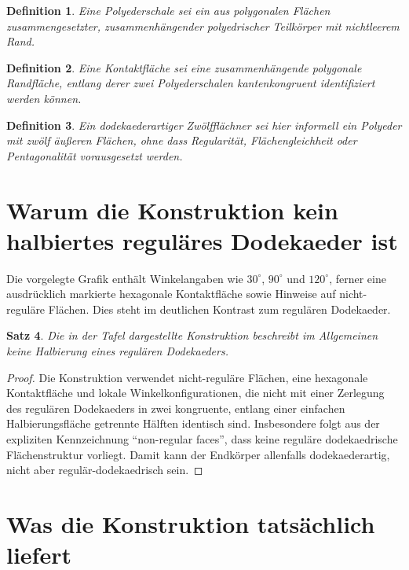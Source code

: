 \documentclass[11pt]{article}
\newtheorem{satz}{Satz}
\newtheorem{definition}[satz]{Definition}
\begin{document}
	\begin{definition}
		Eine \emph{Polyederschale} sei ein aus polygonalen Flächen zusammengesetzter, zusammenhängender polyedrischer Teilkörper mit nichtleerem Rand.
	\end{definition}
	
	\begin{definition}
		Eine \emph{Kontaktfläche} sei eine zusammenhängende polygonale Randfläche, entlang derer zwei Polyederschalen kantenkongruent identifiziert werden können.
	\end{definition}
	
	\begin{definition}
		Ein \emph{dodekaederartiger Zwölfflächner} sei hier informell ein Polyeder mit zwölf äußeren Flächen, ohne dass Regularität, Flächengleichheit oder Pentagonalität vorausgesetzt werden.
	\end{definition}
	
	\section{Warum die Konstruktion kein halbiertes reguläres Dodekaeder ist}
	
	Die vorgelegte Grafik enthält Winkelangaben wie $30^\circ$, $90^\circ$ und $120^\circ$, ferner eine ausdrücklich markierte hexagonale Kontaktfläche sowie Hinweise auf nicht-reguläre Flächen. Dies steht im deutlichen Kontrast zum regulären Dodekaeder.
	
	\begin{satz}
		Die in der Tafel dargestellte Konstruktion beschreibt im Allgemeinen keine Halbierung eines regulären Dodekaeders.
	\end{satz}
	
	\begin{proof}
		Die Konstruktion verwendet nicht-reguläre Flächen, eine hexagonale Kontaktfläche und lokale Winkelkonfigurationen, die nicht mit einer Zerlegung des regulären Dodekaeders in zwei kongruente, entlang einer einfachen Halbierungsfläche getrennte Hälften identisch sind. Insbesondere folgt aus der expliziten Kennzeichnung ``non-regular faces'', dass keine reguläre dodekaedrische Flächenstruktur vorliegt. Damit kann der Endkörper allenfalls dodekaederartig, nicht aber regulär-dodekaedrisch sein.
	\end{proof}
	
	\section{Was die Konstruktion tatsächlich liefert}
	
\end{document}
